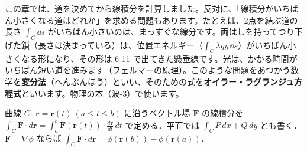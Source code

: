 \begin{motto}[5]
この章では、道を決めてから線積分を計算しました。反対に、「線積分がいちばん小さくなる道はどれか」を求める問題もあります。たとえば、2点を結ぶ道の長さ $\int_C\dd s$ がいちばん小さいのは、まっすぐな線分です。両はしを持ってつり下げた鎖（長さは決まっている）は、位置エネルギー（$\int_C\lambda gy\,\dd s$）がいちばん小さくなる形になり、その形は 6-11 で出てきた懸垂線です。光は、かかる時間がいちばん短い道を進みます（フェルマーの原理）。このような問題をあつかう数学を\textbf{変分法}（へんぶんほう）といい、そのための式を\textbf{オイラー・ラグランジュ方程式}といいます。物理の本（波-3）で使います。
\end{motto}

\begin{senmonsho}[線積分の専門書ふうの書き方]
\begin{bkhonbun}
曲線 $C:\ \symbf{r}=\symbf{r}(t)\ (a\le t\le b)$ に沿うベクトル場 $\symbf{F}$ の線積分を $\displaystyle\int_C\symbf{F}\cdot d\symbf{r}=\int_a^b\symbf{F}(\symbf{r}(t))\cdot\frac{d\symbf{r}}{dt}\,dt$ で定める．平面では $\displaystyle\int_C P\,dx+Q\,dy$ とも書く．$\symbf{F}=\nabla\phi$ ならば $\displaystyle\int_C\symbf{F}\cdot d\symbf{r}=\phi(\symbf{r}(b))-\phi(\symbf{r}(a))$．
\end{bkhonbun}
\end{senmonsho}

